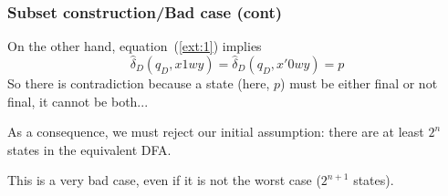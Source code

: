 % 
\begin{frame}
\frametitle{Subset construction/Bad case (cont)}

On the other hand, equation~(\ref{ext:1}) implies
\[
\hat{\delta}_D (q_D, x1wy) = \hat{\delta}_D (q_D, x'0wy) = p
\]
So there is contradiction because a state (here, \(p\)) must be either
final or not final, it cannot be both...

\bigskip

As a consequence, we must reject our initial assumption: there are at
least \(2^n\) states in the equivalent DFA.

\bigskip

This is a very bad case, even if it is not the worst case (\(2^{n+1}\)
states).

\end{frame}
